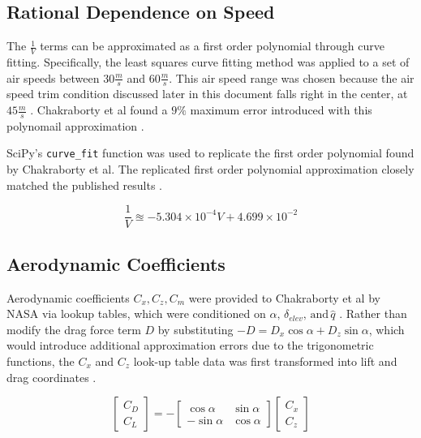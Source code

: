 \documentclass[%
 reprint,
 amsmath,amssymb,
 aps,
]{revtex4-2}
\begin{document}
\subsection{Rational Dependence on Speed}

The $\frac{1}{V}$ terms can be approximated as a first order polynomial through curve fitting. Specifically, the least squares curve fitting method was applied to a set of air speeds between $30 \frac{m}{s}$ and $60 \frac{m}{s}$. This air speed range was chosen because the air speed trim condition discussed later in this document falls right in the center, at $45 \frac{m}{s}$ \cite{primary}. Chakraborty et al found a $9\%$ maximum error introduced with this polynomail approximation \cite{primary}. 

SciPy's \verb+curve_fit+ function was used to replicate the first order polynomial found by Chakraborty et al. The replicated first order polynomial approximation closely matched the published results \cite{primary}.

\begin{equation*}
    \frac{1}{V} \approxeq -5.304 \times 10^{-4} V + 4.699 \times 10^{-2} \tag{18}
\end{equation*}

\subsection{Aerodynamic Coefficients}
Aerodynamic coefficients $C_x, C_z, C_m$ were provided to Chakraborty et al by NASA via lookup tables, which were conditioned on $\alpha,\, \delta_{elev},\, \text{and}\, \hat{q} $ \cite{primary}. Rather than modify the drag force term $D$ by substituting $-D = D_x \cos\alpha + D_z \sin\alpha$, which would introduce additional approximation errors due to the trigonometric functions, the $C_x$ and $C_z$ look-up table data was first transformed into lift and drag coordinates \cite{primary}.

\begin{equation*}
    \begin{bmatrix} C_D \\ C_L \end{bmatrix} = -\begin{bmatrix} \cos\alpha & \sin\alpha \\ -\sin\alpha & \cos\alpha \end{bmatrix} \begin{bmatrix} C_x \\ C_z \end{bmatrix} \tag{19}
\end{equation*}
\end{document}
